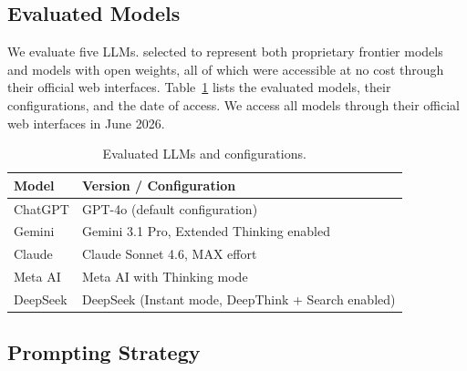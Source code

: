 \documentclass[conference]{IEEEtran}
\begin{document}

\subsection{Evaluated Models} \label{sec:models}

We evaluate five LLMs. selected to represent both proprietary frontier models and models with open weights, all of which were accessible at no cost through their official web interfaces.
Table~\ref{tab:models} lists the evaluated models, their configurations, and the date of access.
We access all models through their official web interfaces in June 2026.

\begin{table}[tbp]
\centering
\caption{Evaluated LLMs and configurations.}
\label{tab:models}
\begin{tabular}{ll}
\toprule
\textbf{Model} & \textbf{Version / Configuration} \\
\midrule
ChatGPT  & GPT-4o (default configuration)                      \\
Gemini   & Gemini 3.1 Pro, Extended Thinking enabled           \\
Claude   & Claude Sonnet 4.6, MAX effort                       \\
Meta AI  & Meta AI with Thinking mode                          \\
DeepSeek & DeepSeek (Instant mode, DeepThink + Search enabled) \\
\bottomrule
\end{tabular}
\end{table}


\subsection{Prompting Strategy} \label{sec:prompt}
\end{document}
